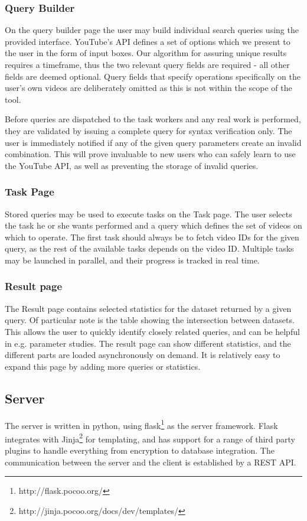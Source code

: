 \subsubsection{Query Builder}
On the query builder page the user may build individual search queries using
the provided interface. YouTube's API defines a set of options which we present
to the user in the form of input boxes. Our algorithm for assuring unique
results requires a timeframe, thus the two relevant query fields are required - 
all other fields are deemed optional. Query fields that specify operations
specifically on the user's own videos are deliberately omitted as this is
not within the scope of the tool.

Before queries are dispatched to the task workers and any real work is
performed, they are validated by issuing a complete query for syntax
verification only. The user is immediately notified if any of the given query
parameters create an invalid combination. This will prove invaluable to new
users who can safely learn to use the YouTube API, as well as preventing
the storage of invalid queries.

\subsubsection{Task Page}
Stored queries may be used to execute tasks on the Task page. The user selects
the task he or she wants performed and a query which defines the set of videos
on which to operate. The first task should always be to fetch video IDs for
the given query, as the rest of the available tasks depends on the video ID. 
Multiple tasks may be launched in parallel, and their progress is tracked in
real time.

\subsubsection{Result page}
The Result page contains selected statistics for the dataset returned by a given
query. Of particular note is the table showing the intersection between datasets.
This allows the user to quickly identify closely related queries, and can be
helpful in e.g. parameter studies. The result page can show different statistics,
and the different parts are loaded asynchronously on demand. It is relatively
easy to expand this page by adding more queries or statistics.

\subsection{Server}
The server is written in python, using flask\footnote{http://flask.pocoo.org/}
as the server framework. Flask integrates with 
Jinja\footnote{http://jinja.pocoo.org/docs/dev/templates/} for templating, 
and has support for a range of third party plugins to handle everything from
encryption to database integration. The communication between the server and
the client is established by a REST API. 



